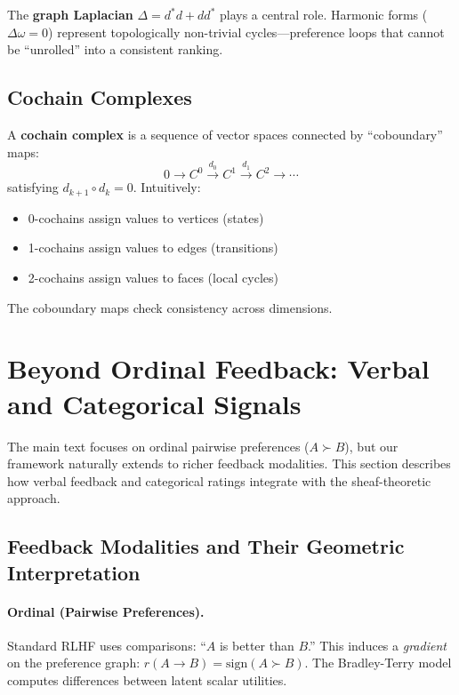 The \textbf{graph Laplacian} $\Delta = d^*d + dd^*$ plays a central role. Harmonic forms ($\Delta \omega = 0$) represent topologically non-trivial cycles---preference loops that cannot be ``unrolled'' into a consistent ranking.

\subsection{Cochain Complexes}

A \textbf{cochain complex} is a sequence of vector spaces connected by ``coboundary'' maps:
\begin{equation}
0 \to C^0 \xrightarrow{d_0} C^1 \xrightarrow{d_1} C^2 \to \cdots
\end{equation}
satisfying $d_{k+1} \circ d_k = 0$. Intuitively:
\begin{itemize}
    \item 0-cochains assign values to vertices (states)
    \item 1-cochains assign values to edges (transitions)
    \item 2-cochains assign values to faces (local cycles)
\end{itemize}
The coboundary maps check consistency across dimensions.

\section{Beyond Ordinal Feedback: Verbal and Categorical Signals}
\label{app:non_ordinal}

The main text focuses on ordinal pairwise preferences ($A \succ B$), but our framework naturally extends to richer feedback modalities. This section describes how verbal feedback and categorical ratings integrate with the sheaf-theoretic approach.

\subsection{Feedback Modalities and Their Geometric Interpretation}

\paragraph{Ordinal (Pairwise Preferences).}
Standard RLHF uses comparisons: ``$A$ is better than $B$.'' This induces a \emph{gradient} on the preference graph: $r(A \to B) = \text{sign}(A \succ B)$. The Bradley-Terry model computes differences between latent scalar utilities.

